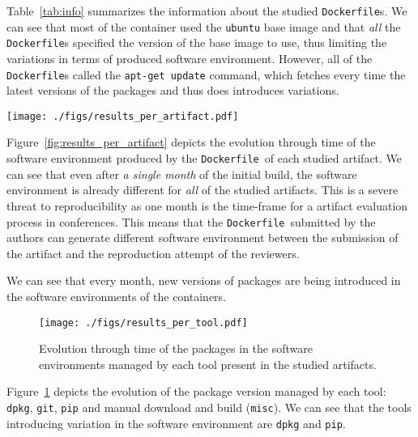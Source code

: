 \documentclass[sigconf,natbib=false]{acmart}
\newcommand{\df}{\texttt{Dockerfile}}
\begin{document}
Table~\ref{tab:info} summarizes the information about the studied \df s.
We can see that most of the container used the \texttt{ubuntu} base image and that \emph{all} the \df s specified the version of the base image to use, thus limiting the variations in terms of produced software environment.
However, all of the \df s called the \texttt{apt-get update} command, which fetches every time the latest versions of the packages and thus does introduces variations.

\begin{figure*}
  \centering
  \texttt{[image: ./figs/results\_per\_artifact.pdf]}
  \caption{
    Evolution of the packages in the software environment of each container through time.
    Each container has been rebuilt once a month.
    The color of the bar corresponds to the month when a specific version of a package has been introduced in the software environment.
    We can see that the proportion of package versions similar to the versions in the initial build is decreasing throught the months.
  }
  \label{fig:results_per_artifact}
\end{figure*}

Figure~\ref{fig:results_per_artifact} depicts the evolution through time of the software environment produced by the \df\ of each studied artifact.
We can see that even after \emph{a single month} of the initial build, the software environment is already different for \emph{all} of the studied artifacts.
This is a severe threat to reproducibility as one month is the time-frame for a artifact evaluation process in conferences.
This means that the \df\ submitted by the authors can generate different software environment between the submission of the artifact and the reproduction attempt of the reviewers.


We can see that every month, new versions of packages are being introduced in the software environments of the containers.



\begin{figure}
  \centering
  \texttt{[image: ./figs/results\_per\_tool.pdf]}
  \caption{
    Evolution through time of the packages in the software environments managed by each tool present in the studied artifacts.
  }\label{fig:results_per_tool}
\end{figure}

Figure~\ref{fig:results_per_tool} depicts the evolution of the package version managed by each tool: \texttt{dpkg}, \texttt{git}, \texttt{pip} and manual download and build (\texttt{misc}).
We can see that the tools introducing variation in the software environment are \texttt{dpkg} and \texttt{pip}.
\end{document}

